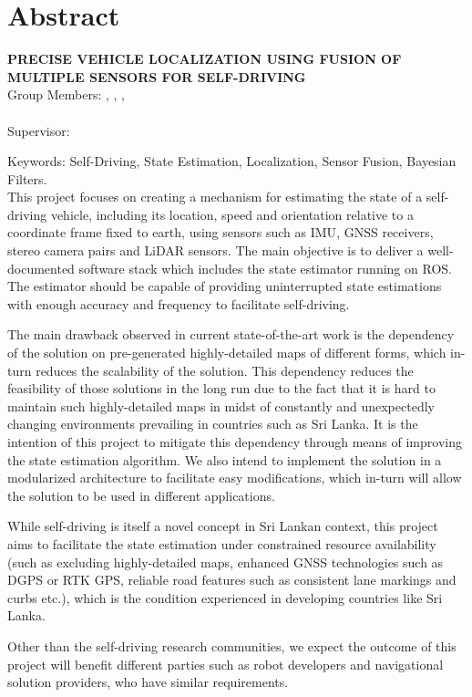 \chapter*{Abstract}

\begin{center}
	\vspace{5mm}
	\MakeUppercase{\textbf{Precise Vehicle Localization Using Fusion of Multiple Sensors for Self-Driving}}\\
	\vspace{5mm}
	Group Members: \memberA, \memberB, \memberC, \\ \memberD \\
	\vspace{5mm}
	Supervisor: \supervisorA \\
	\vspace{5mm}
\end{center}

\noindent Keywords: Self-Driving, State Estimation, Localization, Sensor Fusion, Bayesian Filters. \\

This project focuses on creating a mechanism for estimating the state of a self-driving vehicle, including its location, speed and orientation relative to a coordinate frame fixed to earth, using sensors such as \gls{IMU}, \gls{GNSS} receivers, stereo camera pairs and \gls{LiDAR} sensors. The main objective is to deliver a well-documented software stack which includes the state estimator running on \gls{ROS}. The estimator should be capable of providing uninterrupted state estimations with enough accuracy and frequency to facilitate self-driving.

The main drawback observed in current state-of-the-art work is the dependency of the solution on pre-generated highly-detailed maps of different forms, which in-turn reduces the scalability of the solution. This dependency reduces the feasibility of those solutions in the long run due to the fact that it is hard to maintain such highly-detailed maps in midst of constantly and unexpectedly changing environments prevailing in countries such as Sri Lanka. It is the intention of this project to mitigate this dependency through means of improving the state estimation algorithm. We also intend to implement the solution in a modularized architecture to facilitate easy modifications, which in-turn will allow the solution to be used in different applications.

While self-driving is itself a novel concept in Sri Lankan context, this project aims to facilitate the state estimation under constrained resource availability (such as excluding highly-detailed maps, enhanced \gls{GNSS} technologies such as \gls{DGPS} or \gls{RTK} \gls{GPS}, reliable road features such as consistent lane markings and curbs etc.), which is the condition experienced in developing countries like Sri Lanka. 

Other than the self-driving research communities, we expect the outcome of this project will benefit different parties such as robot developers and navigational solution providers, who have similar requirements.
